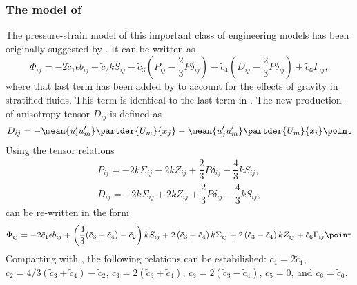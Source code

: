 \subsubsection{The model of \cite{GibsonLaunder78}}
The pressure-strain model of this important class of engineering models 
has been originally suggested by \cite{Launderetal75}. It can be written
as
\begin{equation}
  \label{PhiGL78}
    \Phi_{ij} = - 2 \tilde{c}_1 \epsilon b_{ij} 
    - \tilde{c}_2 k S_{ij} 
    - \tilde{c}_3 \left( P_{ij} - \dfrac{2}{3} P \delta_{ij} \right)
    - \tilde{c}_4 \left( D_{ij} - \dfrac{2}{3} P \delta_{ij} \right)
    + \tilde{c}_6 \Gamma_{ij}
   \comma
\end{equation}
where that last term has been added by \cite{GibsonLaunder78} to 
account for the effects of gravity in stratified fluids. This term is
identical to the last term in .
The new production-of-anisotropy tensor $D_{ij}$ is defined as
\begin{equation}
  \label{Dij}
  D_{ij} = - \mean{u'_i u'_m} \partder{U_m}{x_j} - \mean{u'_j u'_m} \partder{U_m}{x_i}
  \point
\end{equation}
Using the tensor relations
\begin{equation}
  \label{PijTensor}
  \begin{array}{rcl}
   P_{ij} = - 2 k \Sigma_{ij} - 2 k Z_{ij} + \dfrac{2}{3} P \delta_{ij} 
            - \dfrac{4}{3} k S_{ij} \comma   \\[4mm]
   D_{ij} = - 2 k \Sigma_{ij} + 2 k Z_{ij} + \dfrac{2}{3} P \delta_{ij} 
            - \dfrac{4}{3} k S_{ij} \comma  
  \end{array}
\end{equation}
 can be re-written in the form
\begin{equation}
  \label{PhiGL78new}
    \Phi_{ij} = - 2 \tilde{c}_1 \epsilon b_{ij} 
    + \left( \dfrac{4}{3} ( \tilde{c}_3  + \tilde{c}_4 ) - \tilde{c}_2 \right)   k S_{ij} 
    + 2 \left( \tilde{c}_3  + \tilde{c}_4 \right)   k \Sigma_{ij} 
    + 2 \left( \tilde{c}_3  - \tilde{c}_4 \right)   k Z_{ij} 
    + \tilde{c}_6 \Gamma_{ij}
   \point
\end{equation}
Comparting with , the following relations can be estabilished: $c_1 = 2 \tilde{c}_1$, 
$c_2 = 4/3 ( \tilde{c}_3 + \tilde{c}_4 )- \tilde{c}_2$, 
$c_3 = 2 ( \tilde{c}_3 + \tilde{c}_4 )$, $c_3 = 2 ( \tilde{c}_3 - \tilde{c}_4 )$, 
$c_5 = 0$, and $c_6 = \tilde{c}_6$.

